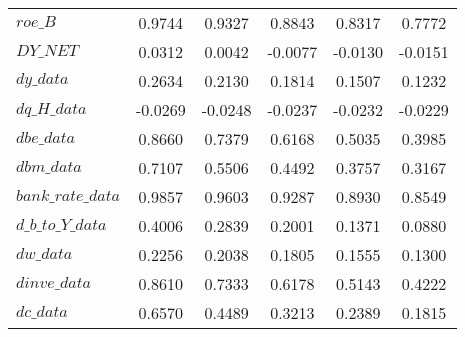 \begin{center}
\begin{longtable}{lccccc}
$roe\_B             $	 & 	    0.9744	 & 	    0.9327	 & 	    0.8843	 & 	    0.8317	 & 	    0.7772 \\ 
$DY\_NET            $	 & 	    0.0312	 & 	    0.0042	 & 	   -0.0077	 & 	   -0.0130	 & 	   -0.0151 \\ 
$dy\_data           $	 & 	    0.2634	 & 	    0.2130	 & 	    0.1814	 & 	    0.1507	 & 	    0.1232 \\ 
$dq\_H\_data        $	 & 	   -0.0269	 & 	   -0.0248	 & 	   -0.0237	 & 	   -0.0232	 & 	   -0.0229 \\ 
$dbe\_data          $	 & 	    0.8660	 & 	    0.7379	 & 	    0.6168	 & 	    0.5035	 & 	    0.3985 \\ 
$dbm\_data          $	 & 	    0.7107	 & 	    0.5506	 & 	    0.4492	 & 	    0.3757	 & 	    0.3167 \\ 
$bank\_rate\_data   $	 & 	    0.9857	 & 	    0.9603	 & 	    0.9287	 & 	    0.8930	 & 	    0.8549 \\ 
$d\_b\_to\_Y\_data  $	 & 	    0.4006	 & 	    0.2839	 & 	    0.2001	 & 	    0.1371	 & 	    0.0880 \\ 
$dw\_data           $	 & 	    0.2256	 & 	    0.2038	 & 	    0.1805	 & 	    0.1555	 & 	    0.1300 \\ 
$dinve\_data        $	 & 	    0.8610	 & 	    0.7333	 & 	    0.6178	 & 	    0.5143	 & 	    0.4222 \\ 
$dc\_data           $	 & 	    0.6570	 & 	    0.4489	 & 	    0.3213	 & 	    0.2389	 & 	    0.1815 \\ 
\end{longtable}
 \end{center}
